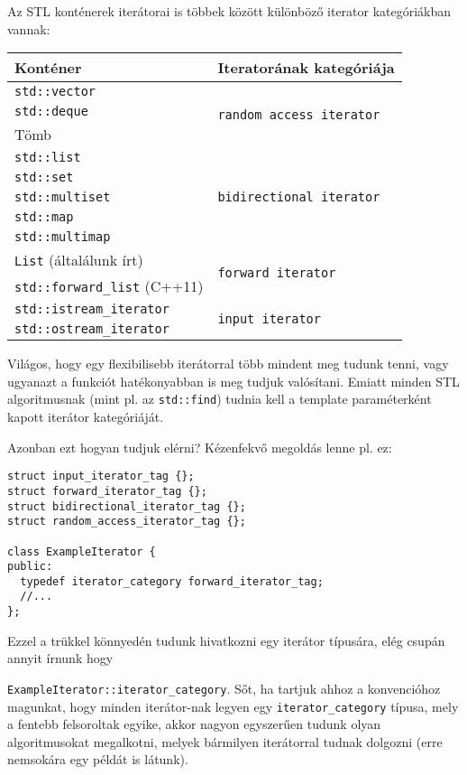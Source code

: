 \documentclass[../cpp_book/cpp_book.tex]{subfiles}
\begin{document}
	\smallskip
	Az STL konténerek iterátorai is többek között különböző iterator kategóriákban vannak:
	\begin{center}
		\setlength{\extrarowheight}{2pt}
		\begin{tabular}{|l|l|}
			\hline
			Konténer&Iteratorának kategóriája\\
			\hline
			\hline
			\texttt{std::vector} & \multirow{3}{*}{\texttt{random access iterator}}\\
			\texttt{std::deque} &\\
			Tömb &\\
			\hline
			\texttt{std::list} & \multirow{5}{*}{\texttt{bidirectional iterator}}\\
			\texttt{std::set} & \\
			\texttt{std::multiset} & \\
			\texttt{std::map} & \\
			\texttt{std::multimap} & \\
			\hline
			\texttt{List} (általálunk írt)& \multirow{2}{*}{\texttt{forward iterator}}\\
			\texttt{std::forward\_list} (C++11)&\\
			\hline
			\texttt{std::istream\_iterator}& \multirow{2}{*}{\texttt{input iterator}}\\
			\texttt{std::ostream\_iterator}&\\
			\hline
		\end{tabular}
	\end{center}
	Világos, hogy egy flexibilisebb iterátorral több mindent meg tudunk tenni, vagy ugyanazt a funkciót hatékonyabban is meg tudjuk valósítani. Emiatt minden STL algoritmusnak (mint pl. az \texttt{std::find}) tudnia kell a template paraméterként kapott iterátor kategóriáját.
	\medskip
	
	Azonban ezt hogyan tudjuk elérni? Kézenfekvő megoldás lenne pl. ez:
	\begin{lstlisting}
struct input_iterator_tag {};
struct forward_iterator_tag {};
struct bidirectional_iterator_tag {};
struct random_access_iterator_tag {};

class ExampleIterator {
public:
  typedef iterator_category forward_iterator_tag;
  //...
};
	\end{lstlisting}
	Ezzel a trükkel könnyedén tudunk hivatkozni egy iterátor típusára, elég csupán annyit írnunk hogy 
	
	\texttt{ExampleIterator::iterator\_category}. Sőt, ha tartjuk ahhoz a konvencióhoz magunkat, hogy minden iterátor-nak legyen egy \texttt{iterator\_category} típusa, mely a fentebb felsoroltak egyike, akkor nagyon egyszerűen tudunk olyan algoritmusokat megalkotni, melyek bármilyen iterátorral tudnak dolgozni (erre nemsokára egy példát is látunk).
	
\end{document}
